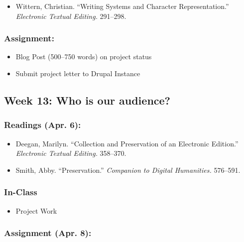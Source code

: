 \documentclass[]{article}
\begin{document}
\begin{itemize}
\itemsep1pt\parskip0pt
\item
  Wittern, Christian. ``Writing Systems and Character Representation.''
  \emph{Electronic Textual Editing.} 291--298.
\end{itemize}

\subsubsection{Assignment:}\label{assignment-1}

\begin{itemize}
\itemsep1pt\parskip0pt
\item
  Blog Post (500--750 words) on project status
\item
  Submit project letter to Drupal Instance
\end{itemize}

\subsection{Week 13: Who is our
audience?}\label{week-13-who-is-our-audience}

\subsubsection{Readings (Apr. 6):}\label{readings-apr.-6}

\begin{itemize}
\itemsep1pt\parskip0pt
\item
  Deegan, Marilyn. ``Collection and Preservation of an Electronic
  Edition.'' \emph{Electronic Textual Editing.} 358--370.
\item
  Smith, Abby. ``Preservation.'' \emph{Companion to Digital Humanities.}
  576--591.
\end{itemize}

\subsubsection{In-Class}\label{in-class}

\begin{itemize}
\itemsep1pt\parskip0pt
\item
  Project Work
\end{itemize}

\subsubsection{Assignment (Apr. 8):}\label{assignment-apr.-8}
\end{document}
